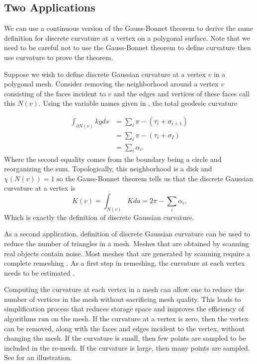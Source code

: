 \subsection{Two Applications}
\label{sec:removing}




We can use a continuous version of the Gauss-Bonnet theorem to derive
the same definition for discrete curvature at a vertex on a polygonal surface.
Note that we need to be careful not to use the Gauss-Bonnet theorem to
define curvature then use curvature to prove the theorem. 


Suppose we wish to define discrete Gaussian curvature at a vertex
$v$ in a polygonal mesh.
Consider removing the neighborhood around a vertex $v$ consisting
of the faces incident to $v$ and the edges and vertices of these faces call
this $N(v)$.
Using the variable names given in ,
the total geodesic curvature

\begin{align}
\int_{\partial N(v)} kg ds &=\sum_i \pi -(\tau_i+\sigma_{i+1})\nonumber  \\
       &=\sum_i \pi -(\tau_i+\sigma_{I}) \nonumber  \\
       &=\sum_i \alpha_i. \nonumber 
\end{align}
Where the second equality comes from the boundary being a circle and reorganizing the sum.
Topologically, this neighborhood is a disk and $\chi(N(v))=1$
so the Gauss-Bonnet theorem tells us that 
the discrete Gaussian curvature at a vertex is
$$K(v)=\int_{N(v)}K da=2\pi-\sum_i \alpha_i.$$
Which is exactly the definition of discrete Gaussian curvature.






As a second application,  definition of discrete Gaussian curvature can be used
to reduce the number of triangles in a mesh. 
Meshes that are obtained by scanning real objects contain noise.
Most meshes that are generated by scanning require a complete
remeshing \cite{remeshing-2003}.
As a first step in remeshing, the curvature at each
vertex needs to be estimated \cite{mmsb-2003}.




Computing the curvature at each vertex in a mesh can allow one to reduce
the number of vertices in the mesh without sacrificing mesh quality.
This leads to simplification process that reduces storage space and improves the efficiency of
 algorithms run on the mesh.
If the curvature at a vertex is zero, then the vertex can be removed,
along with the faces and edges incident to the vertex, without changing 
the mesh.
 If the curvature is small, then few points
are sampled to be included in the re-mesh. If the curvature
is large, then many points are sampled. See 
for an illustration.

